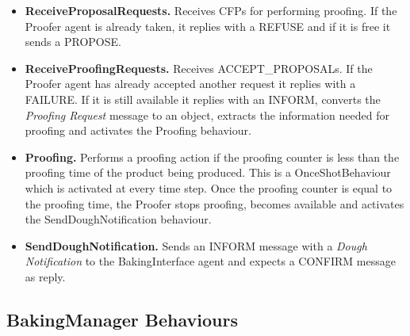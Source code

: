 \documentclass[paper=a4, fontsize=11pt]{scrartcl}
\begin{document}
		\begin{itemize}
			\item \textbf{ReceiveProposalRequests.} Receives CFPs for performing proofing. If the Proofer agent is already taken, it replies with a REFUSE and if it is free it sends a PROPOSE.
			
			\item \textbf{ReceiveProofingRequests.} Receives ACCEPT\_PROPOSALs.  If the Proofer agent has already accepted another request it replies with a FAILURE. If it is still available it replies with an INFORM, converts the \textit{Proofing Request} message to an object, extracts the information needed for proofing and activates the Proofing behaviour. 
			
			\item \textbf{Proofing.} Performs a proofing action if the proofing counter is less than the proofing time of the product being produced. This is a OnceShotBehaviour which is activated at every time step. Once the proofing counter is equal to the proofing time, the Proofer stops proofing, becomes available and activates the SendDoughNotification behaviour.  
			
			\item \textbf{SendDoughNotification.} Sends an INFORM message with a \textit{Dough Notification} to the BakingInterface agent and expects a CONFIRM message as reply. 
		\end{itemize}
		
	\subsection*{BakingManager Behaviours}
	
\end{document}
